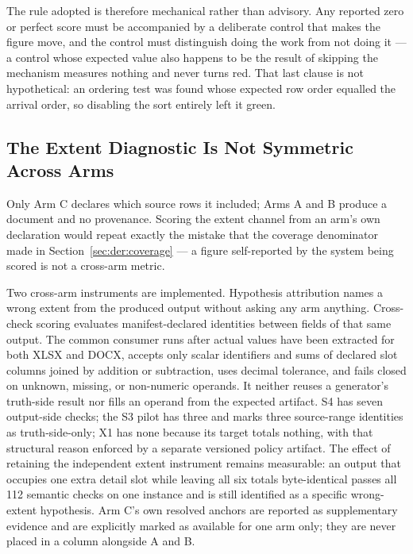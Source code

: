 The rule adopted is therefore mechanical rather than advisory. Any reported zero or perfect
score must be accompanied by a deliberate control that makes the figure move, and the control
must distinguish doing the work from not doing it --- a control whose expected value also
happens to be the result of skipping the mechanism measures nothing and never turns red. That
last clause is not hypothetical: an ordering test was found whose expected row order equalled
the arrival order, so disabling the sort entirely left it green.

\subsection{The Extent Diagnostic Is Not Symmetric Across Arms}
\label{sec:eval:extentasymmetry}

Only Arm C declares which source rows it included; Arms A and B produce a document and no
provenance. Scoring the extent channel from an arm's own declaration would repeat exactly the
mistake that the coverage denominator made in Section~\ref{sec:der:coverage} --- a figure
self-reported by the system being scored is not a cross-arm metric.

Two cross-arm instruments are implemented. Hypothesis attribution names a wrong extent from the
produced output without asking any arm anything. Cross-check scoring evaluates manifest-declared
identities between fields of that same output. The common consumer runs after actual values have
been extracted for both XLSX and DOCX, accepts only scalar identifiers and sums of declared slot
columns joined by addition or subtraction, uses decimal tolerance, and fails closed on unknown,
missing, or non-numeric operands. It neither reuses a generator's truth-side result nor fills an
operand from the expected artifact. S4 has seven output-side checks; the S3 pilot has three and
marks three source-range identities as truth-side-only; X1 has none because its target totals
nothing, with that structural reason enforced by a separate versioned policy artifact.
The effect of retaining the independent extent instrument remains measurable: an output that occupies one extra
detail slot while leaving all six totals byte-identical passes all 112 semantic checks on one
instance and is still identified as a specific wrong-extent hypothesis. Arm C's own resolved
anchors are reported as supplementary evidence and are explicitly marked as available for one
arm only; they are never placed in a column alongside A and B.

